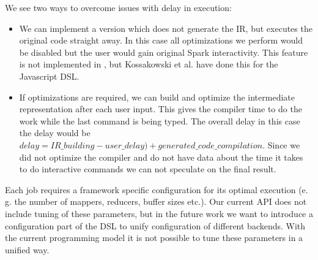 We see two ways to overcome issues with delay in execution:
\begin{itemize}
\item We can implement a version which does not generate the IR, but executes the original code straight away. In this case all optimizations we perform would be disabled but the user would gain original Spark interactivity. This feature is not implemented in \tool, but Kossakowski et al. \cite{greg} have done this for the Javascript DSL.

\item If optimizations are required,  we can build and optimize the intermediate representation after each user input. This gives the compiler time to do the work while the last command is being typed. The overall delay in this case the delay would be $delay = IR\_building - user\_delay) + generated\_code\_compilation$. Since we did not optimize the compiler and do not have data about the time it takes to do interactive commands we can not speculate on the final result.
\end{itemize}

Each job requires a framework specific configuration for its optimal execution (e. g. the number of mappers, reducers, buffer sizes etc.). Our current API does not include tuning of these parameters, but in the future work we want to introduce a configuration part of the DSL to unify configuration of different backends.
With the current programming model it is not possible to tune these parameters in a unified way. 

